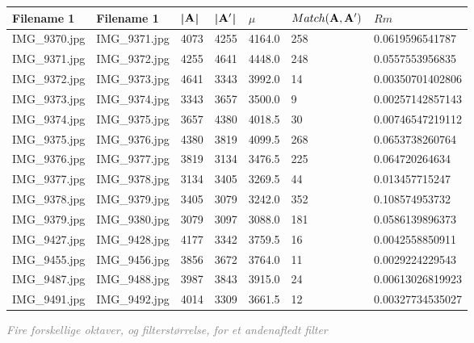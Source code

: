 \begin{figure}[H]
    \centering
    \begin{center}    
    \begin{tabular}{ | l | l | l | l | l | l | l |}
    \hline
    Filename 1 & Filename 1 & |$\bold{A}$| & |$\bold{A'}$| & $\mu$ & $Match(\bold{A}, \bold{A}')$ & $Rm$ \\ \hline
IMG\_9370.jpg &	IMG\_9371.jpg &	4073 &	4255 &	4164.0 &	258 &	0.0619596541787\\ \hline
IMG\_9371.jpg &	IMG\_9372.jpg &	4255 &	4641 &	4448.0 &	248 &	0.0557553956835\\ \hline
IMG\_9372.jpg &	IMG\_9373.jpg &	4641 &	3343 &	3992.0 &	14 &	0.00350701402806\\ \hline
IMG\_9373.jpg &	IMG\_9374.jpg &	3343 &	3657 &	3500.0 &	9 &	0.00257142857143\\ \hline
IMG\_9374.jpg &	IMG\_9375.jpg &	3657 &	4380 &	4018.5 &	30 &	0.00746547219112\\ \hline
IMG\_9375.jpg &	IMG\_9376.jpg &	4380 &	3819 &	4099.5 &	268 &	0.0653738260764\\ \hline
IMG\_9376.jpg &	IMG\_9377.jpg &	3819 &	3134 &	3476.5 &	225 &	0.064720264634\\ \hline
IMG\_9377.jpg &	IMG\_9378.jpg &	3134 &	3405 &	3269.5 &	44 &	0.013457715247\\ \hline
IMG\_9378.jpg &	IMG\_9379.jpg &	3405 &	3079 &	3242.0 &	352 &	0.108574953732\\ \hline
IMG\_9379.jpg &	IMG\_9380.jpg &	3079 &	3097 &	3088.0 &	181 &	0.0586139896373\\ \hline
IMG\_9427.jpg &	IMG\_9428.jpg &	4177 &	3342 &	3759.5 &	16 &	0.0042558850911\\ \hline
IMG\_9455.jpg &	IMG\_9456.jpg &	3856 &	3672 &	3764.0 &	11 &	0.0029224229543\\ \hline
IMG\_9487.jpg &	IMG\_9488.jpg &	3987 &	3843 &	3915.0 &	24 &	0.00613026819923\\ \hline
IMG\_9491.jpg &	IMG\_9492.jpg &	4014 &	3309 &	3661.5 &	12 &	0.00327734535027\\ \hline
    \end{tabular}       
    \caption{\textcolor{gray}{\footnotesize \textit{Fire forskellige oktaver, og filterstørrelse, for et andenafledt filter}}}
    \label{tab:OCTAVE2}
     \end{center}
     \vspace{-2.5em}
\end{figure} \noindent
